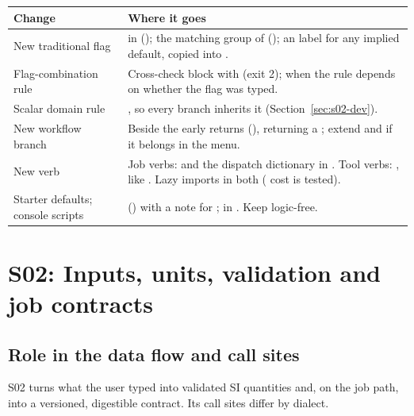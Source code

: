 {\footnotesize
\begin{longtable}{P{3.4cm}P{12.1cm}}
\toprule
Change & Where it goes \\
\midrule
\endhead
New traditional flag &  in  (); the matching group of  (); an  label for any implied default, copied into . \\
Flag-combination rule & Cross-check block  with  (exit 2);  when the rule depends on whether the flag was typed. \\
Scalar domain rule & , so every branch inherits it (Section~\ref{sec:s02-dev}). \\
New workflow branch & Beside the early returns (), returning a ; extend  and  if it belongs in the menu. \\
New verb & Job verbs:  and the dispatch dictionary in . Tool verbs: , like . Lazy imports in both ( cost is tested). \\
Starter defaults; console scripts &  () with a note for ;  in . Keep  logic-free. \\
\bottomrule
\end{longtable}}

\section{S02: Inputs, units, validation and job contracts}\label{sec:s02}

\subsection{Role in the data flow and call sites}\label{sec:s02-role}

S02 turns what the user typed into validated SI quantities and, on the job path, into a versioned, digestible contract. Its call sites differ by dialect.

